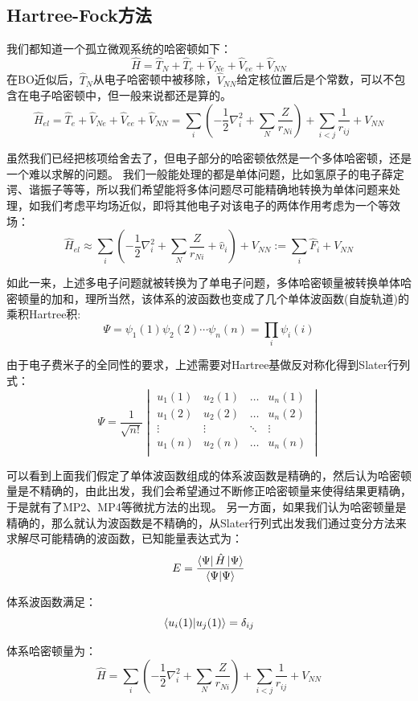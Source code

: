 \subsection{Hartree-Fock方法}
我们都知道一个孤立微观系统的哈密顿如下：
\[\hat{H}=\hat{T}_N+\hat{T}_e+\hat{V}_{Ne}+\hat{V}_{ee}+\hat{V}_{NN}\]
在BO近似后，$\hat{T}_N$从电子哈密顿中被移除，$\hat{V}_{NN}$给定核位置后是个常数，可以不包含在电子哈密顿中，但一般来说都还是算的。
\[\hat{H}_{el}=\hat{T}_e+\hat{V}_{Ne}+\hat{V}_{ee}+\hat{V}_{NN}=\sum_i\left(-\frac{1}{2}\nabla^2_i+\sum_N\frac{Z}{r_{Ni}}\right)+\sum_{i<j}\frac{1}{r_{ij}}+V_{NN}\]

虽然我们已经把核项给舍去了，但电子部分的哈密顿依然是一个多体哈密顿，还是一个难以求解的问题。
我们一般能处理的都是单体问题，比如氢原子的电子薛定谔、谐振子等等，所以我们希望能将多体问题尽可能精确地转换为单体问题来处理，如我们考虑平均场近似，即将其他电子对该电子的两体作用考虑为一个等效场：
\[\hat{H}_{el} \approx \sum_i\left(-\frac{1}{2}\nabla^2_i+\sum_N\frac{Z}{r_{Ni}}+\hat{v}_i\right)+V_{NN}:=\sum_i\hat{F}_i + V_{NN}\]

如此一来，上述多电子问题就被转换为了单电子问题，多体哈密顿量被转换单体哈密顿量的加和，理所当然，该体系的波函数也变成了几个单体波函数(自旋轨道)的乘积Hartree积:
\[\Psi = \psi_1(1)\psi_2(2)\cdots\psi_n(n)=\prod_i\psi_i(i)\]

由于电子费米子的全同性的要求，上述需要对Hartree基做反对称化得到Slater行列式：
\[\Psi=\frac{1}{\sqrt{n!}}
    \begin{vmatrix}
        u_1(1) & u_2(1) & \ldots & u_n(1)\\
        u_1(2) & u_2(2) & \ldots & u_n(2)\\
        \vdots & \vdots & \ddots & \vdots\\
        u_1(n) & u_2(n) & \ldots & u_n(n)\\
    \end{vmatrix}
\]

可以看到上面我们假定了单体波函数组成的体系波函数是精确的，然后认为哈密顿量是不精确的，由此出发，我们会希望通过不断修正哈密顿量来使得结果更精确，于是就有了MP2、MP4等微扰方法的出现。
另一方面，如果我们认为哈密顿量是精确的，那么就认为波函数是不精确的，从Slater行列式出发我们通过变分方法来求解尽可能精确的波函数，已知能量表达式为：
\[E=\frac{\bra{\Psi}\hat{H}\ket{\Psi}}{\bra{\Psi}\ket{\Psi}}\]

体系波函数满足：
\[\bra{u_i(1)}\ket{u_j(1)}=\delta_{ij}\]

体系哈密顿量为：
\[\hat{H}=\sum_i\left(-\frac{1}{2}\nabla^2_i+\sum_N\frac{Z}{r_{Ni}}\right)+\sum_{i<j}\frac{1}{r_{ij}}+V_{NN}\]

